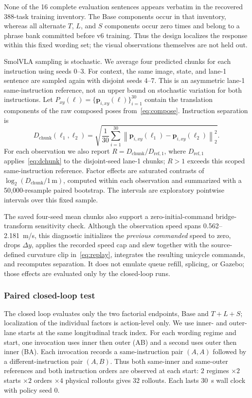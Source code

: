 \documentclass[letterpaper,conference]{IEEEtran}
\newcommand{\dchunk}{D_{\mathrm{chunk}}}
\begin{document}
None of the 16 complete evaluation sentences appears verbatim in the recovered
388-task training inventory. The Base components occur in that inventory,
whereas all alternate $T$, $L$, and $S$ components occur zero times and belong
to a phrase bank committed before v6 training. Thus the design localizes the
response within this fixed wording set; the visual observations themselves are
not held out.

SmolVLA sampling is stochastic. We average four predicted chunks for each
instruction using seeds 0--3. For context, the same image, state, and lane-1
sentence are sampled again with disjoint seeds 4--7. This is an asymmetric
lane-1 same-instruction reference, not an upper bound on stochastic variation
for both instructions. Let
$P_{xy}(\ell)=\{\mathbf{p}_{i,xy}(\ell)\}_{i=1}^{30}$ contain the translation
components of the raw composed poses from~\eqref{eq:compose}. Instruction
separation is
\begin{equation}
\dchunk(\ell_1,\ell_2)=
\sqrt{\frac{1}{30}\sum_{i=1}^{30}
\left\|\mathbf{p}_{i,xy}(\ell_1)-\mathbf{p}_{i,xy}(\ell_2)\right\|_2^2}.
\label{eq:dchunk}
\end{equation}
For each observation we also report $R=\dchunk/D_{\mathrm{ref},1}$, where
$D_{\mathrm{ref},1}$ applies~\eqref{eq:dchunk} to the disjoint-seed lane-1
chunks; $R>1$ exceeds this scoped same-instruction reference.
Factor effects are saturated contrasts of
$\log_2(\dchunk/1\,\mathrm{m})$, computed within each observation and
summarized with a 50,000-resample paired bootstrap. The
intervals are exploratory pointwise intervals over this fixed sample.

The saved four-seed mean chunks also support a zero-initial-command
bridge-transform sensitivity check. Although the observation speed spans
0.562--2.181~m/s, this diagnostic initializes the
\emph{previous commanded} speed to zero, drops $\Delta y$, applies the recorded
speed cap and slew together with the source-defined curvature clip
in~\eqref{eq:replay}, integrates the resulting unicycle commands, and
recomputes separation. It does not emulate queue refill, splicing, or Gazebo;
those effects are evaluated only by the closed-loop runs.

\subsubsection{Paired closed-loop test}
The closed loop evaluates only the two factorial endpoints, Base and
$T{+}L{+}S$; localization of the individual factors is action-level only. We
use inner- and outer-lane starts at the same longitudinal track index. For each
wording regime and start, one invocation uses inner then outer (AB) and a
second uses outer then inner (BA). Each invocation records a same-instruction
pair $(A,A)$ followed by a different-instruction pair $(A,B)$. Thus both
same-inner and same-outer references and both instruction orders are observed at
each start: $2$ regimes $\times2$ starts $\times2$ orders $\times4$ physical
rollouts gives 32 rollouts. Each lasts 30~s wall clock with policy seed 0.
\end{document}
